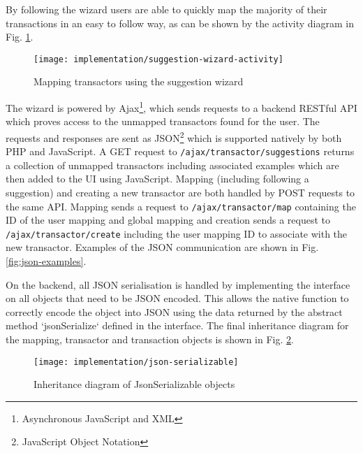 By following the wizard users are able to quickly map the majority of their transactions in an easy to follow way, as can be shown by the activity diagram in Fig. \ref{fig:suggestion-wizard-activity}.

\begin{figure}[h]
    \centering
    \texttt{[image: implementation/suggestion-wizard-activity]}
    \caption{Mapping transactors using the suggestion wizard}
    \label{fig:suggestion-wizard-activity}
    
    \begin{comment}
(start)->(Map Transactor)-><a>->(end)
<a>->(Map Transactor)
    \end{comment}
\end{figure}

The wizard is powered by Ajax\footnote{Asynchronous JavaScript and XML}, which sends requests to a backend RESTful API which proves access to the unmapped transactors found for the user. The requests and responses are sent as JSON\footnote{JavaScript Object Notation} which is supported natively by both PHP and JavaScript. A GET request to \lstinline{/ajax/transactor/suggestions} returns a collection of unmapped transactors including associated examples which are then added to the UI using JavaScript.
%
Mapping (including following a suggestion) and creating a new transactor are both handled by POST requests to the same API. Mapping sends a request to \lstinline{/ajax/transactor/map} containing the ID of the user mapping and global mapping  and creation sends a request to \lstinline{/ajax/transactor/create} including the user mapping ID to associate with the new transactor. 
%
Examples of the JSON communication are shown in Fig. \ref{fig:json-examples}.

On the backend, all JSON serialisation is handled by implementing the  interface on all objects that need to be JSON encoded. This allows the native function  to correctly encode the object into JSON using the data returned by the abstract method `jsonSerialize` defined in the interface. The final inheritance diagram for the mapping, transactor and transaction objects is shown in Fig. \ref{fig:mapping-inheritance-diagram}.

\begin{figure}[h]
    \centering
    \texttt{[image: implementation/json-serializable]}
    \caption{Inheritance diagram of JsonSerializable objects}
    \label{fig:mapping-inheritance-diagram}
    
    \begin{comment}
[<<Interface>> JsonSerializable]^-[<<Abstract>> Transactor]
[<<Interface>> JsonSerializable]^-[<<Abstract>> TransactorMapping]
[<<Interface>> JsonSerializable]^-[Transaction]
[<<Abstract>> TransactorMapping]^-[UserTransactorMapping]
[<<Abstract>> TransactorMapping]^-[GlobalTransactorMapping]
[<<Abstract>> Transactor]^-[UserTransactor]
[<<Abstract>> Transactor]^-[GlobalTransactor]
    \end{comment}
\end{figure}

